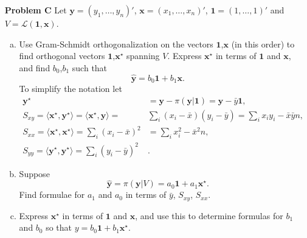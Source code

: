\documentclass{amsart}
\begin{document}
\begin{enumerate}
\begin{proof}[Solution]
\begin{enumerate}[(a)]
\begin{figure}[h]
						\caption{The slop as a function of the project $\hat{y}$} 
						\label{fig3}
					\end{figure}
				\item We compute the least-squares coefficients in R, as instructed,
					\begin{align*}
						\mathbf{b} &= \begin{bmatrix}
							7.068220709 \\ 
							-0.023938338 \\ 
							0.319464761 \\ 
							0.009143961 \\ 
							-0.240524230 \\ 
							-0.074804832
						\end{bmatrix}
					\end{align*}
			\end{enumerate}
		\end{proof}
		\newpage

		\item[\textbf{Problem C}] Let $\mathbf{y} =(y_{1},\dots,y_{n})'$, $\mathbf{x} =(x_{1},\dots,x_{n})'$, $\mathbf{1}=(1,\dots,1)'$ and $V = \mathscr{L}(\mathbf{1},\mathbf{x})$.
			\begin{enumerate}[(a)]
				\item Use Gram-Schmidt orthogonalization on the vectors $\mathbf{1}$,$\mathbf{x}$ (in this order) to find orthogonal vectors $\mathbf{1}$,$\mathbf{x^{\star}}$ spanning $V$. 
				Express $\mathbf{x^{\star}}$ in terms of $\mathbf{1}$ and $\mathbf{x}$, and find $b_{0}$,$b_{1}$ such that $$\mathbf{\hat{y}} = b_{0}\mathbf{1} + b_{1}\mathbf{x}.$$ To simplify the notation let
				\begin{align*}
					\mathbf{y^{\star}} &= \mathbf{y} - \pi(\mathbf{y}|\mathbf{1}) = \mathbf{y}-\bar{y}\mathbf{1}, \\
					S_{xy} = \langle \mathbf{x^{\star}}, \mathbf{y^{\star}} \rangle = \langle \mathbf{x^{\star}}, \mathbf{y}\rangle = &\sum\limits_{i}(x_{i} - \bar{x})(y_{i} - \bar{y}) = \sum\limits_{i} x_{i}y_{i} - \bar{x}\bar{y}n, \\
					S_{xx} = \langle \mathbf{x^{\star}}, \mathbf{x^{\star}} \rangle = \sum\limits_{i}(x_{i} - \bar{x})^{2} &= \sum\limits_{i} x_{i}^{2} - \bar{x}^{2}n, \\
					S_{yy} = \langle \mathbf{y^{\star}}, \mathbf{y^{\star}} \rangle = \sum\limits_{i}(y_{i} - \bar{y})^{2}&.
				\end{align*}
				\item Suppose $$\mathbf{\hat{y}} = \pi(\mathbf{y}|V) = a_{0}\mathbf{1}+a_{1}\mathbf{x^{\star}}.$$ Find formulae for $a_{1}$ and $a_{0}$ in terms of $\bar{y}$, $S_{xy}$, $S_{xx}$.
				\item  Express $\mathbf{x^{\star}}$ in terms of $\mathbf{1}$ and $\mathbf{x}$, and use this to determine formulas for $b_{1}$ and $b_{0}$ so that $y = b_{0}\mathbf{1} + b_{1}\mathbf{x}^{\star} $.


\end{enumerate}
\end{enumerate}
\end{document}
